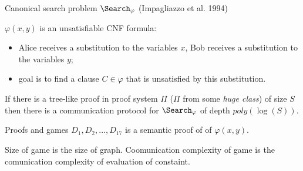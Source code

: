 \begin{frame}{Canonical search problem $\Search_{\varphi}$ (Impagliazzo et al. 1994)}

	
    $\varphi(x, y)$ is an unsatisfiable CNF formula:
    \begin{itemize}
        \item Alice receives a substitution to the variables $x$, Bob receives a substitution to the
            variables $y$;
        \item goal is to find a clause $C \in \varphi$ that is unsatisfied by this substitution.
    \end{itemize}

    \pause

    \begin{theorem}
        If there is a {\color{blue} tree-like} proof in proof system $\Pi$ ($\Pi$ from some \textit{huge
          class}) of size $S$ then there is a communication protocol for $\Search_{\varphi}$ of depth
        $poly(\log(S))$.
    \end{theorem}
    
\end{frame}


\begin{frame}{Proofs and games}
	$D_1, D_2, \dots, D_{17}$ is a semantic proof of of $\varphi(x, y)$.

    \begin{center}
    	    
    \end{center}

    \pause
    Size of game is the size of graph. Coomunication complexity of game is the comunication complexity of
    evaluation of constaint.

\end{frame}



